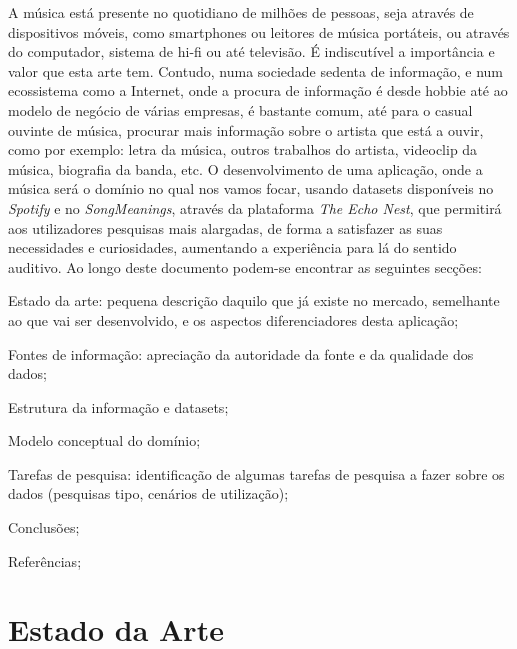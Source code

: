 \documentclass[twocolumn,twoside,11pt,a4paper]{article}
\begin{document}
A música está presente no quotidiano de milhões de pessoas, seja através de dispositivos
móveis, como smartphones ou leitores de música portáteis, ou através do computador,
sistema de hi-fi ou até televisão. É indiscutível a importância e valor que esta arte tem.
Contudo, numa sociedade sedenta de informação, e num ecossistema como a Internet, onde a
procura de informação é desde hobbie até ao modelo de negócio de várias empresas, é
bastante comum, até para o casual ouvinte de música, procurar mais informação sobre o
artista que está a ouvir, como por exemplo: letra da música, outros trabalhos do artista,
videoclip da música, biografia da banda, etc.
O desenvolvimento de uma aplicação, onde a música será o domínio no qual nos vamos focar,
usando datasets disponíveis no \textit{Spotify} e no \textit{SongMeanings}, através da
plataforma \textit{The Echo Nest}, que permitirá aos utilizadores pesquisas mais alargadas, de
forma a satisfazer as suas necessidades e curiosidades, aumentando a experiência para lá
do sentido auditivo.
Ao longo deste documento podem-se encontrar as seguintes secções:
\begin{compactitem}
  \item Estado da arte: pequena descrição daquilo que já existe no mercado, semelhante
    ao que vai ser desenvolvido, e os aspectos diferenciadores desta aplicação;
  \item Fontes de informação: apreciação da autoridade da fonte e da qualidade dos dados;
  \item Estrutura da informação e datasets;
  \item Modelo conceptual do domínio;
  \item Tarefas de pesquisa: identificação de algumas tarefas de pesquisa a fazer sobre
    os dados (pesquisas tipo, cenários de utilização);
  \item Conclusões;
  \item Referências;
\end{compactitem}


\section{Estado da Arte}\label{sec:art}
\end{document}
